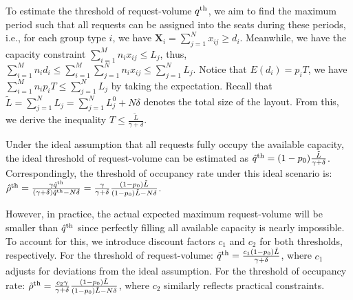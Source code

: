 To estimate the threshold of request-volume $q^{\textup{th}}$, we aim to find the maximum period such that all requests can be assigned into the seats during these periods, i.e., for each group type $i$, we have $\bm{X}_{i} = \sum_{j =1}^{N} x_{ij} \geq d_i$. Meanwhile, we have the capacity constraint $\sum_{i =1}^{M} n_{i} x_{ij} \leq L_j$, thus, $\sum_{i =1}^{M} n_i d_i \leq \sum_{i =1}^{M} \sum_{j =1}^{N} n_i x_{ij} \leq \sum_{j =1}^{N} L_{j}$. Notice that $E(d_i) = p_i T$, we have $\sum_{i =1}^{M} n_i p_i T \leq \sum_{j =1}^{N} L_{j}$ by taking the expectation. Recall that $\tilde{L} = \sum_{j =1}^{N} L_{j} = \sum_{j =1}^{N} L_{j}^{0} + N \delta$ denotes the total size of the layout. From this, we derive the inequality $T \leq \frac{\tilde{L}}{\gamma + \delta}$. 


Under the ideal assumption that all requests fully occupy the available capacity, the ideal threshold of request-volume can be estimated as $\hat{q}^{\textup{th}} = (1-p_0) \frac{\tilde{L}}{\gamma + \delta}$. Correspondingly, the threshold of occupancy rate under this ideal scenario is: 
$\hat{\rho}^{\textup{th}}= \frac{\gamma \hat{q}^{\textup{th}}}{(\gamma+ \delta)\hat{q}^{\textup{th}} - N \delta} = \frac{\gamma}{\gamma +\delta} \frac{(1-p_0) \tilde{L}}{(1-p_0) \tilde{L}-N \delta}$. 

However, in practice, the actual expected maximum request-volume will be smaller than $\hat{q}^{\textup{th}}$ since perfectly filling all available capacity is nearly impossible. To account for this, we introduce discount factors $c_1$ and $c_2$ for both thresholds, respectively. For the threshold of request-volume:
$\tilde{q}^{\textup{th}} =  \frac{c_1 (1-p_0) \tilde{L}}{\gamma + \delta}$, where $c_1$ adjusts for deviations from the ideal assumption.
For the threshold of occupancy rate:
$\tilde{\rho}^{\textup{th}} = \frac{c_2 \gamma}{\gamma +\delta} \frac{(1-p_0) \tilde{L}}{(1-p_0) \tilde{L}-N \delta}$, where $c_2$ similarly reflects practical constraints.